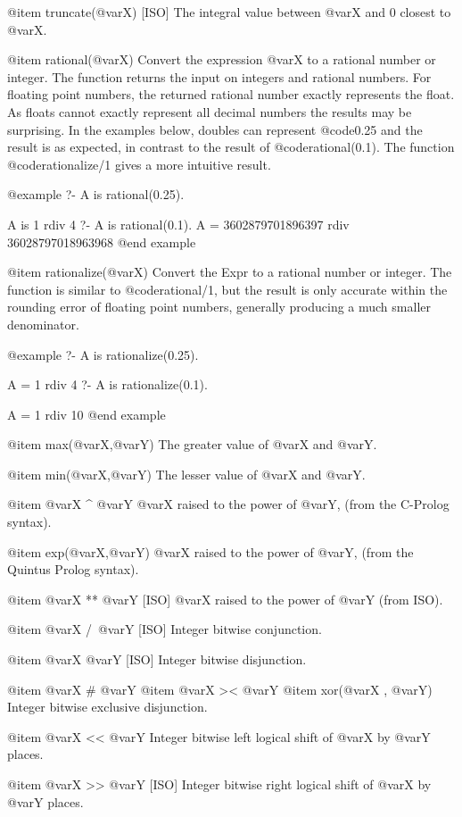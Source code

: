 {{{{@item truncate(@var{X}) [ISO]
The integral value between @var{X} and 0 closest to
@var{X}.

@item rational(@var{X})
Convert the expression @var{X} to a rational number or integer. The
function returns the input on integers and rational numbers. For
floating point numbers, the returned rational number exactly represents
the float. As floats cannot exactly represent all decimal numbers the
results may be surprising. In the examples below, doubles can represent
@code{0.25} and the result is as expected, in contrast to the result of
@code{rational(0.1)}. The function @code{rationalize/1} gives a more
intuitive result.

@example
?- A is rational(0.25).

A is 1 rdiv 4
?- A is rational(0.1).
A = 3602879701896397 rdiv 36028797018963968
@end example

@item rationalize(@var{X})
Convert the Expr to a rational number or integer. The function is
similar to @code{rational/1}, but the result is only accurate within the
rounding error of floating point numbers, generally producing a much
smaller denominator. 

@example
?- A is rationalize(0.25).

A = 1 rdiv 4
?- A is rationalize(0.1).

A = 1 rdiv 10
@end example


@item max(@var{X},@var{Y})
The greater value of @var{X} and @var{Y}.

@item min(@var{X},@var{Y})
The lesser value of @var{X} and @var{Y}.

@item @var{X} ^ @var{Y}
@var{X} raised to the power of @var{Y}, (from the C-Prolog syntax).

@item exp(@var{X},@var{Y})
@var{X} raised to the power of @var{Y}, (from the Quintus Prolog syntax).

@item @var{X} ** @var{Y} [ISO]
@var{X} raised to the power of @var{Y}  (from ISO).

@item @var{X} /\ @var{Y} [ISO]
Integer bitwise conjunction.

@item @var{X} \/ @var{Y} [ISO]
Integer bitwise disjunction.

@item @var{X} # @var{Y}
@item @var{X} >< @var{Y}
@item xor(@var{X} , @var{Y})
Integer bitwise exclusive disjunction.

@item @var{X} << @var{Y}
Integer bitwise left logical shift of @var{X} by @var{Y} places.

@item @var{X} >> @var{Y} [ISO]
Integer bitwise right logical shift of @var{X} by @var{Y} places.

}}}}
